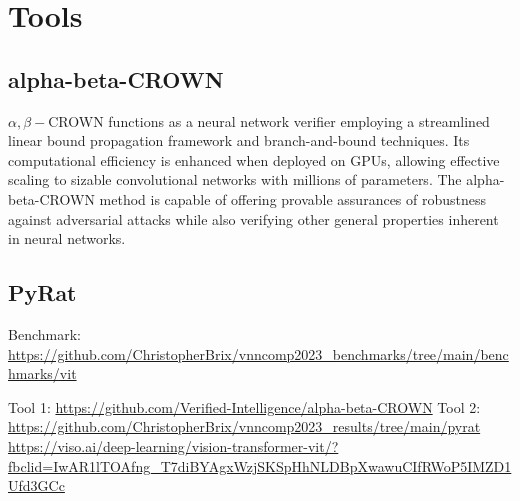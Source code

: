 \documentclass[runningheads]{llncs}
\begin{document}
\section{Tools}

\subsection{alpha-beta-CROWN}
\vspace{5mm}
$\alpha,\beta -$CROWN functions as a neural network verifier employing a streamlined linear bound propagation framework and branch-and-bound techniques. Its computational efficiency is enhanced when deployed on GPUs, allowing effective scaling to sizable convolutional networks with millions of parameters. The alpha-beta-CROWN method is capable of offering provable assurances of robustness against adversarial attacks while also verifying other general properties inherent in neural networks.

\subsection{PyRat}

\newpage
\begin{thebibliography}{9}
\bibitem{}
Benchmark: \url{https://github.com/ChristopherBrix/vnncomp2023_benchmarks/tree/main/benchmarks/vit}

\bibitem{}
Tool 1: \url{https://github.com/Verified-Intelligence/alpha-beta-CROWN}
\bibitem{}
Tool 2: \url{https://github.com/ChristopherBrix/vnncomp2023_results/tree/main/pyrat}
\bibitem{}
\url{https://viso.ai/deep-learning/vision-transformer-vit/?fbclid=IwAR1lTOAfng_T7diBYAgxWzjSKSpHhNLDBpXwawuCIfRWoP5IMZD1Ufd3GCc}
\end{thebibliography}
\end{document}

